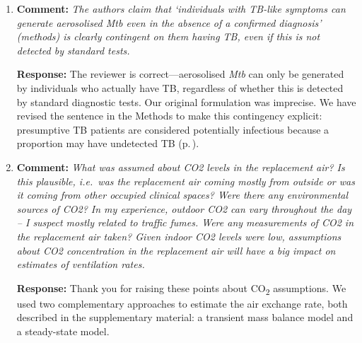 \documentclass[11pt]{article}
\newcommand{\comment}[1]{\textbf{Comment:} \textit{#1}}
\newcommand{\response}[1]{\textbf{Response:} #1}
\begin{document}
\begin{enumerate}[label=\textbf{R2.\arabic*.}, leftmargin=*]
\response{We agree that presenting intervention effects separately is important. To clarify: we do report them individually---the relative reductions in modelled \emph{Mtb} transmission risk are presented separately for each intervention phase with means and 95\% credible intervals (e.g., 39\% reduction for the first intervention, 21\% for the second). The summed count of prevented infections over the entire intervention period was intended to convey the overall magnitude of the combined effect, given that the two interventions are cumulative (the second retained all measures from the first and added a patient flow system).

We agree with the reviewer that the absolute count of prevented infections requires context and is difficult to interpret without a denominator. We have therefore revised the Abstract and Results to report prevented infections as a daily rate and as a rate per entry ($\approx$\,clinic attendee), in addition to the relative risk reductions (Results: p.\,\pageref{chg:R2.9rates}).}

\item\label{r:2.10} \comment{The authors claim that `individuals with TB-like symptoms can generate aerosolised \emph{Mtb} even in the absence of a confirmed diagnosis' (methods) is clearly contingent on them having TB, even if this is not detected by standard tests.}

\response{The reviewer is correct---aerosolised \emph{Mtb} can only be generated by individuals who actually have TB, regardless of whether this is detected by standard diagnostic tests. Our original formulation was imprecise. We have revised the sentence in the Methods to make this contingency explicit: presumptive TB patients are considered potentially infectious because a proportion may have undetected TB (p.\,\pageref{chg:R2.10}).}

\item\label{r:2.11} \comment{What was assumed about CO2 levels in the replacement air? Is this plausible, i.e.\ was the replacement air coming mostly from outside or was it coming from other occupied clinical spaces? Were there any environmental sources of CO2? In my experience, outdoor CO2 can vary throughout the day -- I suspect mostly related to traffic fumes. Were any measurements of CO2 in the replacement air taken? Given indoor CO2 levels were low, assumptions about CO2 concentration in the replacement air will have a big impact on estimates of ventilation rates.}

\response{Thank you for raising these points about CO\textsubscript{2} assumptions. We used two complementary approaches to estimate the air exchange rate, both described in the supplementary material: a transient mass balance model and a steady-state model.

}
\end{enumerate}
\end{document}
